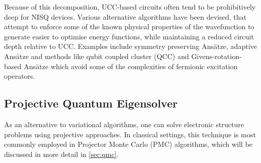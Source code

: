 \documentclass[%
 reprint,
 amsmath,amssymb,
 aps,
]{revtex4-2}
\begin{document}
Because of this decomposition, UCC-based circuits often tend to be prohibitively deep for NISQ devices. { Various alternative algorithms have been devised, that attempt to enforce some of the known physical properties of the wavefunction to generate easier to optimise energy functions, while maintaining a reduced circuit depth relative to UCC. Examples include} symmetry preserving Ans\"atze,\cite{Gard2020} adaptive Ans\"atze\cite{Grimsley2019b} and methods like qubit coupled cluster (QCC)\cite{Ryabinkin2018,Ryabinkin2020} and Givens-rotation-based Ans\"atze\cite{Arrazola2022} which avoid some of the complexities of fermionic excitation operators.
\subsection{Projective Quantum Eigensolver}
As an alternative to variational algorithms, one can solve electronic structure problems using projective approaches. In classical settings, this technique is most commonly employed in Projector Monte Carlo (PMC) algorithms, which will be discussed in more detail in \cref{sec:qmc}.
\end{document}
